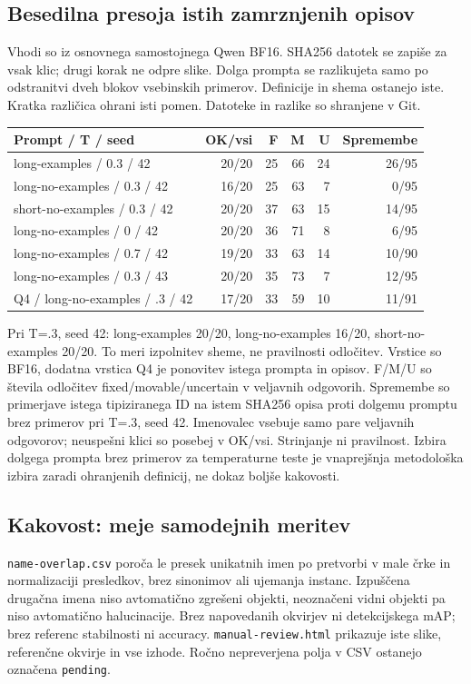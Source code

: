 \documentclass[10pt,a4paper]{article}
\begin{document}
\subsection*{Besedilna presoja istih zamrznjenih opisov}
Vhodi so iz osnovnega samostojnega Qwen BF16. SHA256 datotek se zapiše za vsak klic; drugi korak ne odpre slike. Dolga prompta se razlikujeta samo po odstranitvi dveh blokov vsebinskih primerov. Definicije in shema ostanejo iste. Kratka različica ohrani isti pomen. Datoteke in razlike so shranjene v Git.
\begin{center}\small\begin{tabular}{lrrrrr}\toprule
Prompt / T / seed & OK/vsi & F & M & U & Spremembe \\ \midrule
long-examples / 0.3 / 42 & 20/20 & 25 & 66 & 24 & 26/95 \\
long-no-examples / 0.3 / 42 & 16/20 & 25 & 63 & 7 & 0/95 \\
short-no-examples / 0.3 / 42 & 20/20 & 37 & 63 & 15 & 14/95 \\
long-no-examples / 0 / 42 & 20/20 & 36 & 71 & 8 & 6/95 \\
long-no-examples / 0.7 / 42 & 19/20 & 33 & 63 & 14 & 10/90 \\
long-no-examples / 0.3 / 43 & 20/20 & 35 & 73 & 7 & 12/95 \\
Q4 / long-no-examples / .3 / 42 & 17/20 & 33 & 59 & 10 & 11/91 \\
\bottomrule\end{tabular}\end{center}
Pri T=.3, seed 42: long-examples 20/20, long-no-examples 16/20, short-no-examples 20/20. To meri izpolnitev sheme, ne pravilnosti odločitev.
Vrstice so BF16, dodatna vrstica Q4 je ponovitev istega prompta in opisov. F/M/U so števila odločitev fixed/movable/uncertain v veljavnih odgovorih. Spremembe so primerjave istega tipiziranega ID na istem SHA256 opisa proti dolgemu promptu brez primerov pri T=.3, seed 42. Imenovalec vsebuje samo pare veljavnih odgovorov; neuspešni klici so posebej v OK/vsi. Strinjanje ni pravilnost. Izbira dolgega prompta brez primerov za temperaturne teste je vnaprejšnja metodološka izbira zaradi ohranjenih definicij, ne dokaz boljše kakovosti.
\subsection*{Kakovost: meje samodejnih meritev}
\texttt{name-overlap.csv} poroča le presek unikatnih imen po pretvorbi v male črke in normalizaciji presledkov, brez sinonimov ali ujemanja instanc. Izpuščena drugačna imena niso avtomatično zgrešeni objekti, neoznačeni vidni objekti pa niso avtomatično halucinacije. Brez napovedanih okvirjev ni detekcijskega mAP; brez referenc stabilnosti ni accuracy. \texttt{manual-review.html} prikazuje iste slike, referenčne okvirje in vse izhode. Ročno nepreverjena polja v CSV ostanejo označena \texttt{pending}.
\end{document}
